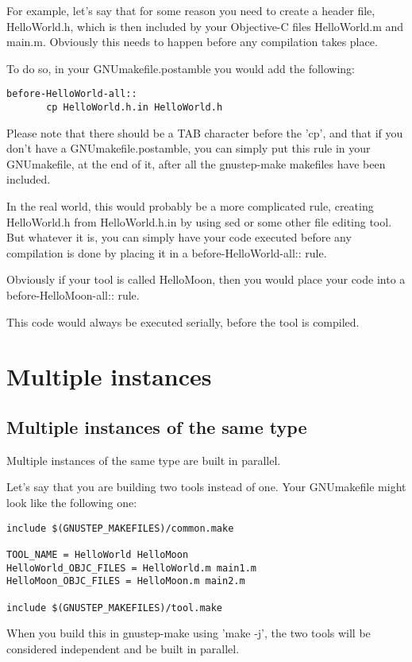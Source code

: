 \documentclass[a4paper]{article}
\begin{document}
For example, let's say that for some reason you need to create a
header file, HelloWorld.h, which is then included by your Objective-C
files HelloWorld.m and main.m.  Obviously this needs to happen before
any compilation takes place.

To do so, in your GNUmakefile.postamble you would add the following:
\begin{verbatim}
before-HelloWorld-all::
       cp HelloWorld.h.in HelloWorld.h
\end{verbatim}
Please note that there should be a TAB character before the 'cp', and
that if you don't have a GNUmakefile.postamble, you can simply put
this rule in your GNUmakefile, at the end of it, after all the
gnustep-make makefiles have been included.

In the real world, this would probably be a more complicated rule,
creating HelloWorld.h from HelloWorld.h.in by using sed or some other
file editing tool.  But whatever it is, you can simply have your code
executed before any compilation is done by placing it in a
before-HelloWorld-all:: rule.

Obviously if your tool is called HelloMoon, then you would place your
code into a before-HelloMoon-all:: rule.

This code would always be executed serially, before the tool is
compiled.

\section{Multiple instances}

\subsection{Multiple instances of the same type}
Multiple instances of the same type are built in parallel.

Let's say that you are building two tools instead of one.  Your
GNUmakefile might look like the following one:

\begin{verbatim}
include $(GNUSTEP_MAKEFILES)/common.make

TOOL_NAME = HelloWorld HelloMoon
HelloWorld_OBJC_FILES = HelloWorld.m main1.m
HelloMoon_OBJC_FILES = HelloMoon.m main2.m

include $(GNUSTEP_MAKEFILES)/tool.make
\end{verbatim}

When you build this in gnustep-make using 'make -j', the two tools
will be considered independent and be built in parallel.
\end{document}
